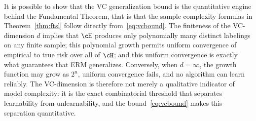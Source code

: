%
%

It is possible to show that the VC generalization bound is the quantitative engine behind the
Fundamental Theorem, that is that the sample complexity formulas in Theorem~\ref{thm:ftsl} follow directly from~\eqref{eq:vcbound}.
The finiteness of the VC-dimension $d$ implies that $\cH$ produces only polynomially many distinct labelings on any finite sample;
this polynomial growth permits uniform convergence of empirical to true risk over all of
$\cH$; and this uniform convergence is exactly what guarantees that ERM generalizes.
Conversely, when $d = \infty$, the growth function may grow as $2^n$, uniform convergence
fails, and no algorithm can learn reliably. The VC-dimension is therefore not merely a
qualitative indicator of model complexity: it is the exact combinatorial threshold that
separates learnability from unlearnability, and the bound~\eqref{eq:vcbound} makes this
separation quantitative.

%